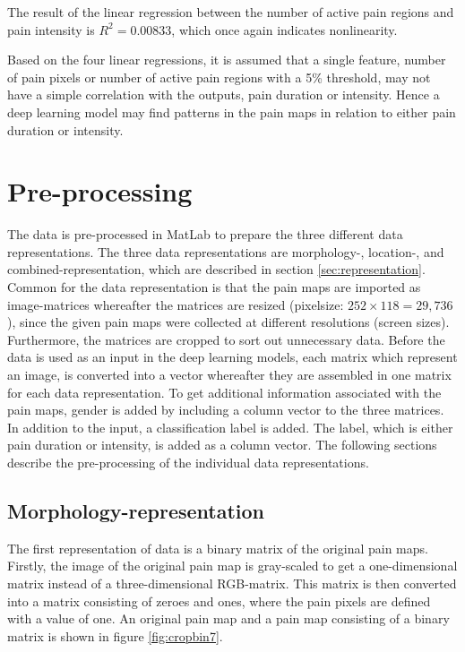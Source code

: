 \noindent
The result of the linear regression between the number of active pain regions and pain intensity is $R^2=0.00833$, which once again indicates nonlinearity. 

\noindent
Based on the four linear regressions, it is assumed that a single feature, number of pain pixels or number of active pain regions with a 5\% threshold, may not have a simple correlation with the outputs, pain duration or intensity. Hence a deep learning model may find patterns in the pain maps in relation to either pain duration or intensity.\newpage


\section{Pre-processing} \label{sec:prepros}
The data is pre-processed in MatLab to prepare the three different data representations. The three data representations are morphology-, location-, and combined-representation, which are described in section \ref{sec:representation}. Common for the data representation is that the pain maps are imported as image-matrices whereafter the matrices are resized (pixelsize: $252 \times 118 = 29,736$), since the given pain maps were collected at different resolutions (screen sizes). Furthermore, the matrices are cropped to sort out unnecessary data.
Before the data is used as an input in the deep learning models, each matrix which represent an image, is converted into a vector whereafter they are assembled in one matrix for each data representation. To get additional information associated with the pain maps, gender is added by including a column vector to the three matrices.
In addition to the input, a classification label is added. The label, which is either pain duration or intensity, is added as a column vector.
The following sections describe the pre-processing of the individual data representations.

\subsection{Morphology-representation} \label{sec:Morph}
The first representation of data is a binary matrix of the original pain maps.
Firstly, the image of the original pain map is gray-scaled to get a one-dimensional matrix instead of a three-dimensional RGB-matrix. This matrix is then converted into a matrix consisting of zeroes and ones, where the pain pixels are defined with a value of one. An original pain map and a pain map consisting of a binary matrix is shown in figure \ref{fig:cropbin7}.


